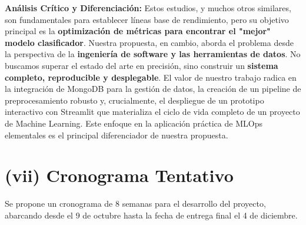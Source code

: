 \documentclass[12pt]{src/formato_utem}
\begin{document}
\textbf{Análisis Crítico y Diferenciación:} Estos estudios, y muchos otros similares, son fundamentales para establecer líneas base de rendimiento, pero su objetivo principal es la \textbf{optimización de métricas para encontrar el "mejor" modelo clasificador}. Nuestra propuesta, en cambio, aborda el problema desde la perspectiva de la \textbf{ingeniería de software y las herramientas de datos}. No buscamos superar el estado del arte en precisión, sino construir un \textbf{sistema completo, reproducible y desplegable}. El valor de nuestro trabajo radica en la integración de MongoDB para la gestión de datos, la creación de un pipeline de preprocesamiento robusto y, crucialmente, el despliegue de un prototipo interactivo con Streamlit que materializa el ciclo de vida completo de un proyecto de Machine Learning. Este enfoque en la aplicación práctica de MLOps elementales es el principal diferenciador de nuestra propuesta.
\newpage
\section*{(vii) Cronograma Tentativo}
Se propone un cronograma de 8 semanas para el desarrollo del proyecto, abarcando desde el 9 de octubre hasta la fecha de entrega final el 4 de diciembre.
\end{document}
